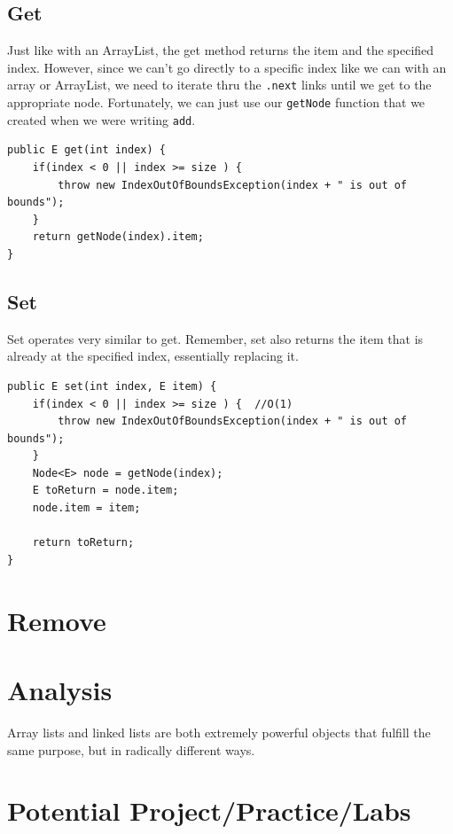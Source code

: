 \documentclass[10pt,a4paper]{book}
\begin{document}
\subsection{Get}
Just like with an ArrayList, the get method returns the item and the specified index.  
However, since we can't go directly to a specific index like we can with an array or ArrayList, we need to iterate thru the \texttt{.next} links until we get to the appropriate node.
Fortunately, we can just use our \texttt{getNode} function that we created when we were writing \texttt{add}.

 

\begin{verbatim}
public E get(int index) {
	if(index < 0 || index >= size ) { 
		throw new IndexOutOfBoundsException(index + " is out of bounds");
	}
	return getNode(index).item;
}
\end{verbatim}


\subsection{Set}

Set operates very similar to get.  Remember, set also returns the item that is already at the specified index, essentially replacing it.

\begin{verbatim}
public E set(int index, E item) {
	if(index < 0 || index >= size ) {  //O(1)
		throw new IndexOutOfBoundsException(index + " is out of bounds");
	}
	Node<E> node = getNode(index);
	E toReturn = node.item;
	node.item = item;
	
	return toReturn;
}
\end{verbatim}


\section{Remove}




\section{Analysis}
Array lists and linked lists are both extremely powerful objects that fulfill  the same purpose, but in radically different ways. 

\section{Potential Project/Practice/Labs}
\end{document}
